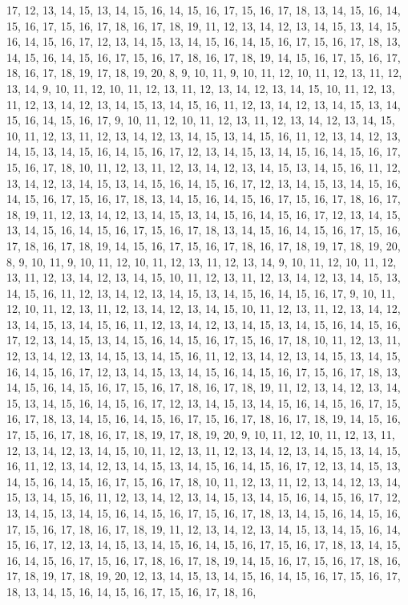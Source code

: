 \begin{DoxyCompactItemize}
17, 12, 13, 14, 15, 13, 14, 15, 16, 14, 15, 16, 17, 15, 16, 17, 18, 13, 14, 15, 16, 14, 15, 16, 17, 15, 16, 17, 18, 16, 17, 18, 19, 11, 12, 13, 14, 12, 13, 14, 15, 13, 14, 15, 16, 14, 15, 16, 17, 12, 13, 14, 15, 13, 14, 15, 16, 14, 15, 16, 17, 15, 16, 17, 18, 13, 14, 15, 16, 14, 15, 16, 17, 15, 16, 17, 18, 16, 17, 18, 19, 14, 15, 16, 17, 15, 16, 17, 18, 16, 17, 18, 19, 17, 18, 19, 20, 8, 9, 10, 11, 9, 10, 11, 12, 10, 11, 12, 13, 11, 12, 13, 14, 9, 10, 11, 12, 10, 11, 12, 13, 11, 12, 13, 14, 12, 13, 14, 15, 10, 11, 12, 13, 11, 12, 13, 14, 12, 13, 14, 15, 13, 14, 15, 16, 11, 12, 13, 14, 12, 13, 14, 15, 13, 14, 15, 16, 14, 15, 16, 17, 9, 10, 11, 12, 10, 11, 12, 13, 11, 12, 13, 14, 12, 13, 14, 15, 10, 11, 12, 13, 11, 12, 13, 14, 12, 13, 14, 15, 13, 14, 15, 16, 11, 12, 13, 14, 12, 13, 14, 15, 13, 14, 15, 16, 14, 15, 16, 17, 12, 13, 14, 15, 13, 14, 15, 16, 14, 15, 16, 17, 15, 16, 17, 18, 10, 11, 12, 13, 11, 12, 13, 14, 12, 13, 14, 15, 13, 14, 15, 16, 11, 12, 13, 14, 12, 13, 14, 15, 13, 14, 15, 16, 14, 15, 16, 17, 12, 13, 14, 15, 13, 14, 15, 16, 14, 15, 16, 17, 15, 16, 17, 18, 13, 14, 15, 16, 14, 15, 16, 17, 15, 16, 17, 18, 16, 17, 18, 19, 11, 12, 13, 14, 12, 13, 14, 15, 13, 14, 15, 16, 14, 15, 16, 17, 12, 13, 14, 15, 13, 14, 15, 16, 14, 15, 16, 17, 15, 16, 17, 18, 13, 14, 15, 16, 14, 15, 16, 17, 15, 16, 17, 18, 16, 17, 18, 19, 14, 15, 16, 17, 15, 16, 17, 18, 16, 17, 18, 19, 17, 18, 19, 20, 8, 9, 10, 11, 9, 10, 11, 12, 10, 11, 12, 13, 11, 12, 13, 14, 9, 10, 11, 12, 10, 11, 12, 13, 11, 12, 13, 14, 12, 13, 14, 15, 10, 11, 12, 13, 11, 12, 13, 14, 12, 13, 14, 15, 13, 14, 15, 16, 11, 12, 13, 14, 12, 13, 14, 15, 13, 14, 15, 16, 14, 15, 16, 17, 9, 10, 11, 12, 10, 11, 12, 13, 11, 12, 13, 14, 12, 13, 14, 15, 10, 11, 12, 13, 11, 12, 13, 14, 12, 13, 14, 15, 13, 14, 15, 16, 11, 12, 13, 14, 12, 13, 14, 15, 13, 14, 15, 16, 14, 15, 16, 17, 12, 13, 14, 15, 13, 14, 15, 16, 14, 15, 16, 17, 15, 16, 17, 18, 10, 11, 12, 13, 11, 12, 13, 14, 12, 13, 14, 15, 13, 14, 15, 16, 11, 12, 13, 14, 12, 13, 14, 15, 13, 14, 15, 16, 14, 15, 16, 17, 12, 13, 14, 15, 13, 14, 15, 16, 14, 15, 16, 17, 15, 16, 17, 18, 13, 14, 15, 16, 14, 15, 16, 17, 15, 16, 17, 18, 16, 17, 18, 19, 11, 12, 13, 14, 12, 13, 14, 15, 13, 14, 15, 16, 14, 15, 16, 17, 12, 13, 14, 15, 13, 14, 15, 16, 14, 15, 16, 17, 15, 16, 17, 18, 13, 14, 15, 16, 14, 15, 16, 17, 15, 16, 17, 18, 16, 17, 18, 19, 14, 15, 16, 17, 15, 16, 17, 18, 16, 17, 18, 19, 17, 18, 19, 20, 9, 10, 11, 12, 10, 11, 12, 13, 11, 12, 13, 14, 12, 13, 14, 15, 10, 11, 12, 13, 11, 12, 13, 14, 12, 13, 14, 15, 13, 14, 15, 16, 11, 12, 13, 14, 12, 13, 14, 15, 13, 14, 15, 16, 14, 15, 16, 17, 12, 13, 14, 15, 13, 14, 15, 16, 14, 15, 16, 17, 15, 16, 17, 18, 10, 11, 12, 13, 11, 12, 13, 14, 12, 13, 14, 15, 13, 14, 15, 16, 11, 12, 13, 14, 12, 13, 14, 15, 13, 14, 15, 16, 14, 15, 16, 17, 12, 13, 14, 15, 13, 14, 15, 16, 14, 15, 16, 17, 15, 16, 17, 18, 13, 14, 15, 16, 14, 15, 16, 17, 15, 16, 17, 18, 16, 17, 18, 19, 11, 12, 13, 14, 12, 13, 14, 15, 13, 14, 15, 16, 14, 15, 16, 17, 12, 13, 14, 15, 13, 14, 15, 16, 14, 15, 16, 17, 15, 16, 17, 18, 13, 14, 15, 16, 14, 15, 16, 17, 15, 16, 17, 18, 16, 17, 18, 19, 14, 15, 16, 17, 15, 16, 17, 18, 16, 17, 18, 19, 17, 18, 19, 20, 12, 13, 14, 15, 13, 14, 15, 16, 14, 15, 16, 17, 15, 16, 17, 18, 13, 14, 15, 16, 14, 15, 16, 17, 15, 16, 17, 18, 16, 
\end{DoxyCompactItemize}
